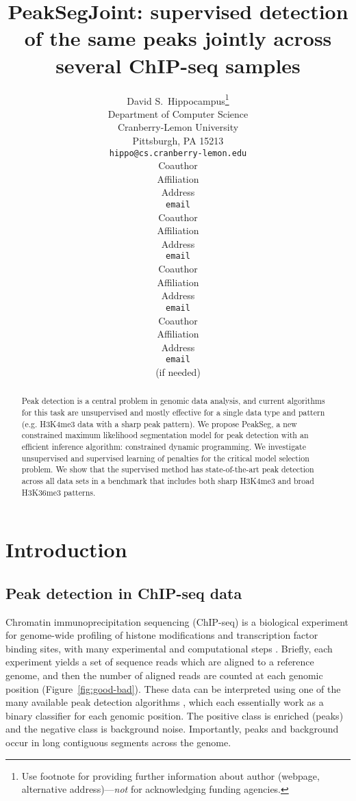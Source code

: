 \documentclass{article} %
\title{PeakSegJoint: supervised detection of the same peaks jointly
  across several ChIP-seq samples}
\author{
David S.~Hippocampus\thanks{ Use footnote for providing further information
about author (webpage, alternative address)---\emph{not} for acknowledging
funding agencies.} \\
Department of Computer Science\\
Cranberry-Lemon University\\
Pittsburgh, PA 15213 \\
\texttt{hippo@cs.cranberry-lemon.edu} \\
\And
Coauthor \\
Affiliation \\
Address \\
\texttt{email} \\
\AND
Coauthor \\
Affiliation \\
Address \\
\texttt{email} \\
\And
Coauthor \\
Affiliation \\
Address \\
\texttt{email} \\
\And
Coauthor \\
Affiliation \\
Address \\
\texttt{email} \\
(if needed)\\
}
\begin{document}
\maketitle

\begin{abstract}
  Peak detection is a central problem in genomic data analysis, and
  current algorithms for this task are unsupervised and mostly
  effective for a single data type and pattern (e.g. H3K4me3 data with
  a sharp peak pattern). We propose PeakSeg, a new constrained maximum
  likelihood segmentation model for peak detection with an efficient
  inference algorithm: constrained dynamic programming. We investigate
  un\-super\-vised and super\-vised learning of penalties for
  the critical model selection problem. We show that the 
  super\-vised method has state-of-the-art peak
  detection across all data sets in a benchmark that includes both
  sharp H3K4me3 and broad H3K36me3 patterns.
\end{abstract}

\section{Introduction}

\subsection{Peak detection in ChIP-seq data}

Chromatin immunoprecipitation sequencing (ChIP-seq) is a biological
experiment for genome-wide profiling of histone modifications and
transcription factor binding sites, with many experimental and
computational steps \citep{practical}. Briefly, each experiment yields
a set of sequence reads which are aligned to a reference genome, and
then the number of aligned reads are counted at each genomic position
(Figure~\ref{fig:good-bad}). These data can be interpreted using
one of the many available peak detection algorithms
\citep{evaluation2010, rye2010manually, chip-seq-bench}, which each
essentially work as a binary classifier for each genomic position. The
positive class is enriched (peaks) and the negative class is
background noise. Importantly, peaks and background occur in long
contiguous segments across the genome.




\end{document}

